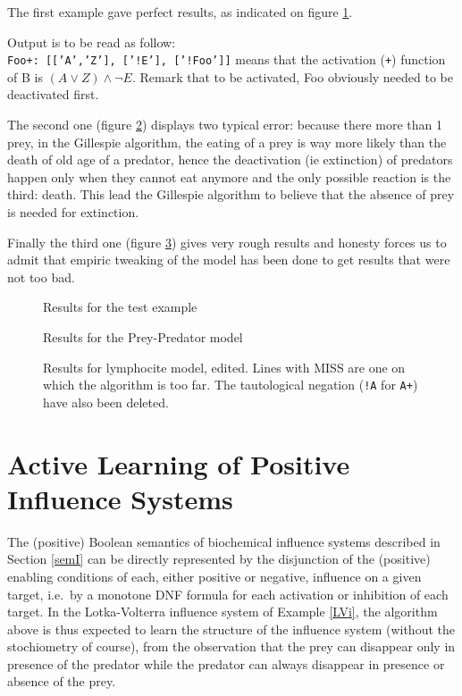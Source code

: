 \documentclass{llncs}
\begin{document}
The first example gave perfect results, as indicated on figure \ref{test_res}.

Output is to be read as follow:\\
\texttt{Foo+:~[['A','Z'],~['!E'],~['!Foo']]} means that the activation (\texttt{+}) function of B is $(A \vee Z)\wedge\neg E$. Remark that to be activated, Foo obviously needed to be deactivated first.

The second one (figure \ref{preypred_res}) displays two typical error: because there more than 1 prey, in the Gillespie algorithm, the eating of a prey is way more likely than the death of old age of a predator, hence the deactivation (ie extinction) of predators happen only when they cannot eat anymore and the only possible reaction is the third: death. This lead the Gillespie algorithm to believe that the absence of prey is needed for extinction.

Finally the third one (figure \ref{lympho_res}) gives very rough results and honesty forces us to admit that empiric tweaking of the model has been done to get results that were not too bad.

\begin{figure}
	
	\caption{Results for the test example \label{test_res}}
\end{figure}
\begin{figure}
	
	\caption{Results for the Prey-Predator model\label{preypred_res}}
\end{figure}
\begin{figure}
	
	\caption{Results for lymphocite model, edited. Lines with MISS are one on which the algorithm is too far. The tautological negation (\texttt{!A} for \texttt{A+}) have also been deleted.\label{lympho_res}}
\end{figure}


\section{Active Learning of Positive Influence Systems}

The (positive) Boolean semantics of biochemical influence systems described in Section \ref{semI}
can be directly represented by the disjunction of the (positive) enabling conditions of each, either positive or negative, influence on a given target,
i.e.~by a monotone DNF formula for each activation or inhibition of each target.
In the Lotka-Volterra influence system of Example \ref{LVi}, the algorithm above is thus expected to learn the structure of the influence system
(without the stochiometry of course),
from the observation that the prey can disappear only in presence of the predator
while the predator can always disappear in presence or absence of the prey.
\end{document}
